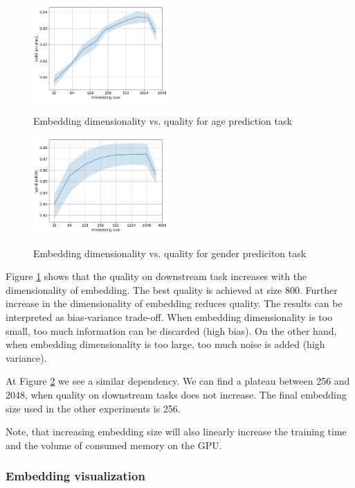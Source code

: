 \documentclass[sigconf, anonymous]{acmart}
\begin{document}
\begin{figure}[h]
  \caption{Embedding dimensionality vs. quality for age prediction task}
  \includegraphics[width=0.46\textwidth]{figures/age-pred-hidden-size.png}
  \label{fig-emb-dim-age}
\end{figure}

\begin{figure}[h]
  \caption{Embedding dimensionality vs. quality for gender prediciton task}
  \includegraphics[width=0.46\textwidth]{figures/gender-hidden-size.png}
  \label{fig-emb-dim-gender}
\end{figure}

Figure \ref{fig-emb-dim-age} shows that the quality on downstream task increases with the dimensionality of embedding. The best quality is achieved at size 800. Further increase in the dimensionality of embedding reduces quality.
The results can be interpreted as bias-variance trade-off. When embedding dimensionality is too small, too much information can be discarded (high bias). On the other hand, when embedding dimensionality is too large, too much noise is added (high variance).

At Figure \ref{fig-emb-dim-gender} we see a similar dependency. We can find a plateau between 256 and 2048, when quality on downstream tasks does not increase. The final embedding size used in the other experiments is 256.

Note, that increasing embedding size will also linearly increase the training time and the volume of consumed memory on the GPU.

\subsubsection{Embedding visualization}
\end{document}
